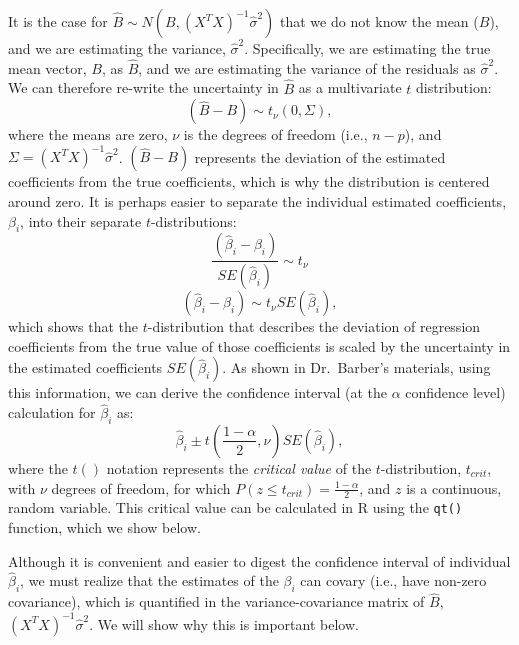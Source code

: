 \documentclass[
  letterpaper,
  DIV=11,
  numbers=noendperiod]{scrreprt}
\begin{document}
It is the case for
\(\hat{B} \sim N \left( B, (X^TX)^{-1} \hat{\sigma}^2 \right)\) that we
do not know the mean (\(B\)), and we are estimating the variance,
\(\hat{\sigma}^2\). Specifically, we are estimating the true mean
vector, \(B\), as \(\hat{B}\), and we are estimating the variance of the
residuals as \(\hat{\sigma}^2\). We can therefore re-write the
uncertainty in \(\hat{B}\) as a multivariate \(t\) distribution:
\[(\hat{B} - B) \sim t_{\nu} \left( 0, \Sigma \right),\] where the means
are zero, \(\nu\) is the degrees of freedom (i.e., \(n-p\)), and
\(\Sigma = (X^TX)^{-1} \hat{\sigma}^2\). \((\hat{B} - B)\) represents
the deviation of the estimated coefficients from the true coefficients,
which is why the distribution is centered around zero. It is perhaps
easier to separate the individual estimated coefficients, \(\beta_i\),
into their separate \(t\)-distributions:
\[\frac{(\hat{\beta}_i - \beta_i)}{SE(\hat{\beta}_i)} \sim t_{\nu}\]
\[(\hat{\beta}_i - \beta_i) \sim t_{\nu} SE(\hat{\beta}_i),\] which
shows that the \(t\)-distribution that describes the deviation of
regression coefficients from the true value of those coefficients is
scaled by the uncertainty in the estimated coefficients
\(SE(\hat{\beta}_i)\). As shown in Dr.~Barber's materials, using this
information, we can derive the confidence interval (at the \(\alpha\)
confidence level) calculation for \(\hat{\beta}_i\) as:
\[ \hat{\beta}_i \pm t \left(\frac{1-\alpha}{2}, \nu \right) SE(\hat{\beta}_i),\]
where the \(t()\) notation represents the \emph{critical value} of the
\(t\)-distribution, \(t_{crit}\), with \(\nu\) degrees of freedom, for
which \(P(z \le t_{crit}) = \frac{1-\alpha}{2}\), and \(z\) is a
continuous, random variable. This critical value can be calculated in R
using the \texttt{qt()} function, which we show below.

\begin{tcolorbox}[enhanced jigsaw, colback=white, title=\textcolor{quarto-callout-note-color}{\faInfo}\hspace{0.5em}{Covariance of \(\hat{\beta}_i\)}, left=2mm, coltitle=black, bottomrule=.15mm, arc=.35mm, toprule=.15mm, rightrule=.15mm, opacityback=0, opacitybacktitle=0.6, colframe=quarto-callout-note-color-frame, leftrule=.75mm, toptitle=1mm, titlerule=0mm, breakable, bottomtitle=1mm, colbacktitle=quarto-callout-note-color!10!white]

Although it is convenient and easier to digest the confidence interval
of individual \(\hat{\beta}_i\), we must realize that the estimates of
the \(\beta_i\) can covary (i.e., have non-zero covariance), which is
quantified in the variance-covariance matrix of \(\hat{B}\),
\((X^TX)^{-1} \hat{\sigma}^2\). We will show why this is important
below.

\end{tcolorbox}
\end{document}
